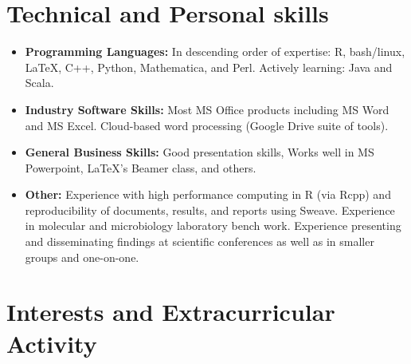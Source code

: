 \documentclass[11pt,a4paper,sans]{moderncv}        %
\begin{document}
\section{Technical and Personal skills}

\vspace{6pt}

\begin{itemize}

\item \textbf{Programming Languages:} In descending order of expertise: R, bash/linux, \LaTeX, C++, Python, Mathematica, and Perl. Actively learning: Java and Scala. 

\vspace{6pt}

\item \textbf{Industry Software Skills:} Most MS Office products including MS Word and MS Excel. Cloud-based word processing (Google Drive suite of tools).

\vspace{6pt}

\item \textbf{General Business Skills:} Good presentation skills, Works well in MS Powerpoint, \LaTeX's Beamer class, and others. 

\vspace{6pt}

\item \textbf{Other:} Experience with high performance computing in R (via Rcpp) and reproducibility of documents, results, and reports using Sweave.  Experience in molecular and microbiology laboratory bench work. Experience presenting and disseminating findings at scientific conferences as well as in smaller groups and one-on-one. 

\end{itemize}

\section{Interests and Extracurricular Activity}

\vspace{6pt}
\end{document}
